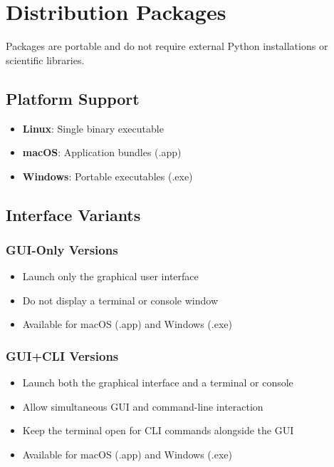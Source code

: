 \documentclass[11pt,a4paper]{article}
\begin{document}
\section{Distribution Packages}
Packages are portable and do not require external Python installations or scientific libraries.

\subsection{Platform Support}
\begin{itemize}
  \item \textbf{Linux}: Single binary executable
  \item \textbf{macOS}: Application bundles (.app)
  \item \textbf{Windows}: Portable executables (.exe)
\end{itemize}

\subsection{Interface Variants}

\subsubsection{GUI-Only Versions}
\begin{itemize}
  \item Launch only the graphical user interface
  \item Do not display a terminal or console window
  \item Available for macOS (.app) and Windows (.exe)
\end{itemize}

\subsubsection{GUI+CLI Versions}
\begin{itemize}
  \item Launch both the graphical interface and a terminal or console
  \item Allow simultaneous GUI and command-line interaction
  \item Keep the terminal open for CLI commands alongside the GUI
  \item Available for macOS (.app) and Windows (.exe)
\end{itemize}
\end{document}
